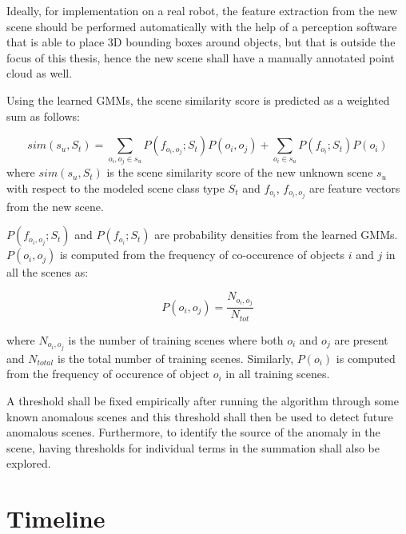 \documentclass[12pt]{article}
\begin{document}
Ideally, for implementation on a real robot, the feature extraction from the new scene should be performed automatically with the help of a perception software that is able to place 3D bounding boxes around objects, but that is outside the focus of this thesis, hence the new scene shall have a manually annotated point cloud as well.

Using the learned GMMs, the scene similarity score is predicted as a weighted sum as follows:

\[sim(s_u, S_t) = \sum_{o_i, o_j \in s_u} P(f_{o_i, o_j};S_t)P(o_i, o_j) + 
\sum_{o_i \in s_u} P(f_{o_i};S_t)P(o_i)\]
where $sim(s_u, S_t)$ is the scene similarity score of the new unknown scene $s_u$ with respect to the modeled scene class type $S_t$ and $f_{o_i}$, $f_{o_i, o_j}$ are feature vectors from the new scene. 

$P(f_{o_i, o_j};S_t)$ and $P(f_{o_i};S_t)$ are probability densities from the learned GMMs. $P(o_i, o_j)$ is computed from the frequency of co-occurence of objects $i$ and $j$ in all the scenes as:

\[P(o_i, o_j) = \frac{N_{o_i, o_j}}{N_{tot}}\]

where $N_{o_i, o_j}$ is the number of training scenes where both $o_i$ and $o_j$ are present and $N_{total}$ is the total number of training scenes. Similarly, $P(o_i)$ is computed from the frequency of occurence of object $o_i$ in all training scenes.

A threshold shall be fixed empirically after running the algorithm through some known anomalous scenes and this threshold shall then be used to detect future anomalous scenes. Furthermore, to identify the source of the anomaly in the scene, having thresholds for individual terms in the summation shall also be explored.






\section{Timeline}
\end{document}
